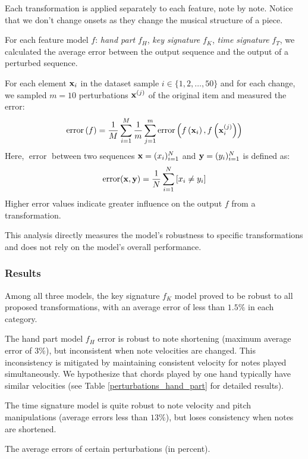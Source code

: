 Each transformation is applied separately to each feature, note by note. Notice that we don't change onsets as they change the musical structure of a piece.

For each feature model $f$: \emph{hand part} $f_H$, \emph{key signature} $f_K$, \emph{time signature} $f_T$, we calculated the average error between the output sequence and the output of a perturbed sequence.

For each element ${\bf x}_i$ in the dataset sample $i\in\{1,2,\ldots,50\}$ and for each change, we sampled $m=10$ perturbations ${\bf x}^{(j)}$ of the original item and measured the error: \[\operatorname{error}\left(f\right) = \frac{1}{M}\sum_{i=1}^{M}\frac{1}{m}\sum_{j=1}^{m}\operatorname{error}\left(f\left({\bf x}_i\right), f\left({\bf x}_i^{(j)}\right)\right)\] Here, $\operatorname{error}$ between two sequences ${\bf x} = (x_i)_{i=1}^N$ and ${\bf y} = (y_i)_{i=1}^N$ is defined as: \[\operatorname{error}({\bf x},{\bf y}) = \frac{1}{N}\sum_{i=1}^N \left[x_i \neq y_i\right]\] Higher error values indicate greater influence on the output $f$ from a transformation.

This analysis directly measures the model's robustness to specific transformations and does not rely on the model's overall performance.

\subsubsection{Results}

Among all three models, the key signature $f_K$ model proved to be robust to all proposed transformations, with an average error of less than $1.5\%$ in each category.

The hand part model $f_H$ error is robust to note shortening (maximum average error of $3\%$), but inconsistent when note velocities are changed. This inconsistency is mitigated by maintaining consistent velocity for notes played simultaneously. We hypothesize that chords played by one hand typically have similar velocities (see Table \ref{perturbations_hand_part} for detailed results).

The time signature model is quite robust to note velocity and pitch manipulations (average errors less than $13\%$), but loses consistency when notes are shortened. \begin{table}[ht!]

\caption{The average errors of certain perturbations (in percent).}
\label{perturbations}
\end{table}

